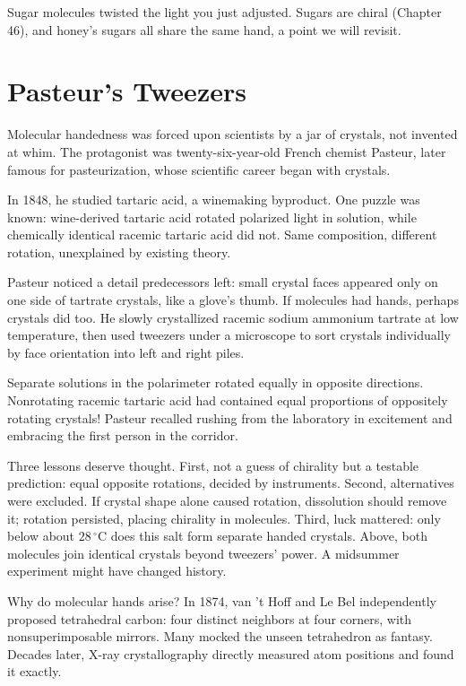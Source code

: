 Sugar molecules twisted the light you just adjusted. Sugars are chiral (Chapter 46), and honey's sugars all share the same hand, a point we will revisit.

\section{Pasteur's Tweezers}

\begin{zhengju}
Molecular handedness was forced upon scientists by a jar of crystals, not invented at whim. The protagonist was twenty-six-year-old French chemist Pasteur, later famous for pasteurization, whose scientific career began with crystals.

In 1848, he studied tartaric acid, a winemaking byproduct. One puzzle was known: wine-derived tartaric acid rotated polarized light in solution, while chemically identical racemic tartaric acid did not. Same composition, different rotation, unexplained by existing theory.

Pasteur noticed a detail predecessors left: small crystal faces appeared only on one side of tartrate crystals, like a glove's thumb. If molecules had hands, perhaps crystals did too. He slowly crystallized racemic sodium ammonium tartrate at low temperature, then used tweezers under a microscope to sort crystals individually by face orientation into left and right piles.

Separate solutions in the polarimeter rotated equally in opposite directions. Nonrotating racemic tartaric acid had contained equal proportions of oppositely rotating crystals! Pasteur recalled rushing from the laboratory in excitement and embracing the first person in the corridor.

Three lessons deserve thought. First, not a guess of chirality but a testable prediction: equal opposite rotations, decided by instruments. Second, alternatives were excluded. If crystal shape alone caused rotation, dissolution should remove it; rotation persisted, placing chirality in molecules. Third, luck mattered: only below about $28\,^{\circ}\mathrm{C}$ does this salt form separate handed crystals. Above, both molecules join identical crystals beyond tweezers' power. A midsummer experiment might have changed history.

Why do molecular hands arise? In 1874, van 't Hoff and Le Bel independently proposed tetrahedral carbon: four distinct neighbors at four corners, with nonsuperimposable mirrors. Many mocked the unseen tetrahedron as fantasy. Decades later, X-ray crystallography directly measured atom positions and found it exactly.
\end{zhengju}

